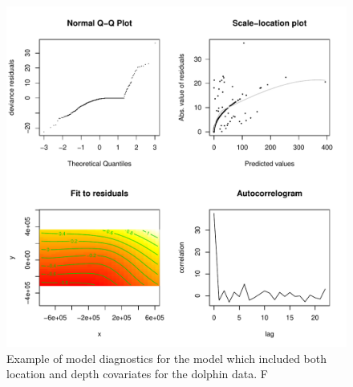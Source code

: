 \documentclass[a4paper,12pt]{article}
\begin{document}
\newpage

\begin{figure}[h!]
  \caption{Example of model diagnostics for the model which included both location and depth covariates for the dolphin data. F }
  \label{dsm-check}
  \begin{center}
    \includegraphics[width=\textwidth]{figs/dsm-check}
  \end{center}
\end{figure}
\end{document}
